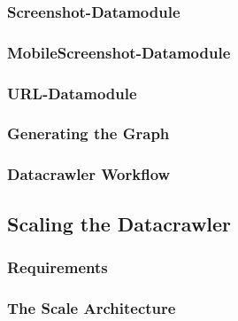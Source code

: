 \subsubsection{Screenshot-Datamodule}
\label{datacrawler_screenshot_datamodule}

\subsubsection{MobileScreenshot-Datamodule}
\label{datacrawler_mobilescreenshot_datamodule}

\subsubsection{URL-Datamodule}
\label{datacrawler_url_datamodule}

\subsubsection{Generating the Graph}
\label{datacrawler_graph}
\subsubsection{Datacrawler Workflow}
\label{datacrawler_workflow}

\subsection{Scaling the Datacrawler}
\label{datacrawler_scale}

\subsubsection{Requirements}
\label{datacrawler_scale_requirements}

\subsubsection{The Scale Architecture}
\label{datacrawler_scale_architecture}


